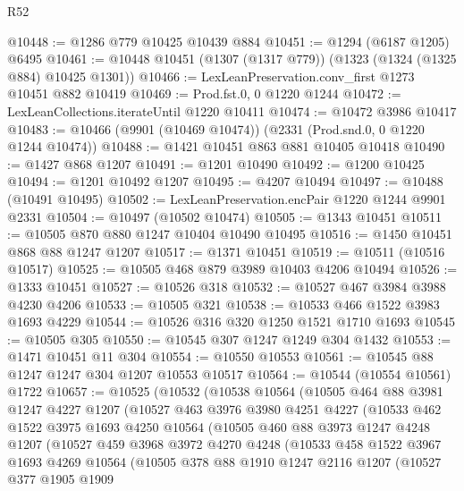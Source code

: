 \begin{lexlean}{R52}
\begin{coremodule}
@10448 := @1286 @779 @10425 @10439 @884
@10451 := @1294 (@6187 @1205) @6495
@10461 := @10448 @10451 (@1307 (@1317 @779)) (@1323 (@1324 (@1325 @884) @10425 @1301))
@10466 := LexLeanPreservation.conv_first @1273 @10451 @882 @10419
@10469 := Prod.fst.{0, 0} @1220 @1244
@10472 := LexLeanCollections.iterateUntil @1220 @10411
@10474 := @10472 @3986 @10417
@10483 := @10466 (@9901 (@10469 @10474)) (@2331 (Prod.snd.{0, 0} @1220 @1244 @10474))
@10488 := @1421 @10451 @863 @881 @10405 @10418
@10490 := @1427 @868 @1207
@10491 := @1201 @10490
@10492 := @1200 @10425
@10494 := @1201 @10492 @1207
@10495 := @4207 @10494
@10497 := @10488 (@10491 @10495)
@10502 := LexLeanPreservation.encPair @1220 @1244 @9901 @2331
@10504 := @10497 (@10502 @10474)
@10505 := @1343 @10451
@10511 := @10505 @870 @880 @1247 @10404 @10490 @10495
@10516 := @1450 @10451 @868 @88 @1247 @1207
@10517 := @1371 @10451
@10519 := @10511 (@10516 @10517)
@10525 := @10505 @468 @879 @3989 @10403 @4206 @10494
@10526 := @1333 @10451
@10527 := @10526 @318
@10532 := @10527 @467 @3984 @3988 @4230 @4206
@10533 := @10505 @321
@10538 := @10533 @466 @1522 @3983 @1693 @4229
@10544 := @10526 @316 @320 @1250 @1521 @1710 @1693
@10545 := @10505 @305
@10550 := @10545 @307 @1247 @1249 @304 @1432
@10553 := @1471 @10451 @11 @304
@10554 := @10550 @10553
@10561 := @10545 @88 @1247 @1247 @304 @1207 @10553 @10517
@10564 := @10544 (@10554 @10561) @1722
@10657 := @10525
    (@10532
      (@10538
        @10564
        (@10505
          @464
          @88
          @3981
          @1247
          @4227
          @1207
          (@10527
            @463
            @3976
            @3980
            @4251
            @4227
            (@10533
              @462
              @1522
              @3975
              @1693
              @4250
              @10564
              (@10505
                @460
                @88
                @3973
                @1247
                @4248
                @1207
                (@10527
                  @459
                  @3968
                  @3972
                  @4270
                  @4248
                  (@10533
                    @458
                    @1522
                    @3967
                    @1693
                    @4269
                    @10564
                    (@10505
                      @378
                      @88
                      @1910
                      @1247
                      @2116
                      @1207
                      (@10527
                        @377
                        @1905
                        @1909

\end{coremodule}
\end{lexlean}
